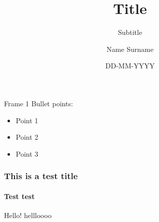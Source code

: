 \documentclass[pdf]{beamer}
\date{DD-MM-YYYY}
\title{Title}
\subtitle{Subtitle}
\author{Name Surname}
\begin{document}
\begin{frame}
\titlepage
\end{frame}

\begin{frame}{Frame 1}
Bullet points:

\begin{itemize}
\item Point 1
\item Point 2
\item Point 3
\end{itemize}

\vfill
\end{frame}

\begin{frame}
  \frametitle{This is a test title}
  \framesubtitle{Test test}
  Hello!
  \vfill
  hellloooo
\end{frame}
\end{document}
